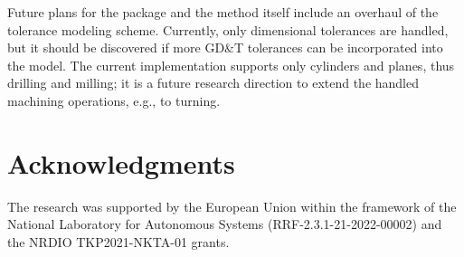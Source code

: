 \documentclass{juliacon}
\begin{document}
Future plans for the package and the method itself include an overhaul of the tolerance modeling scheme.
Currently, only dimensional tolerances are handled, but it should be discovered if more GD\&T tolerances can be incorporated into the model.
The current implementation supports only cylinders and planes, thus drilling and milling; it is a future research direction to extend the handled machining operations, e.g., to turning.



\section{Acknowledgments}
The research was supported by the European Union within the framework of the National Laboratory for Autonomous Systems (RRF-2.3.1-21-2022-00002) and the NRDIO TKP2021-NKTA-01 grants.


\end{document}
